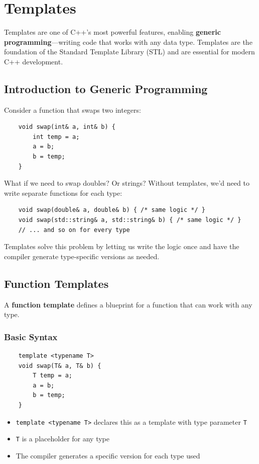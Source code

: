 \section{Templates}

Templates are one of C++'s most powerful features, enabling \textbf{generic programming}---writing code that works with any data type. Templates are the foundation of the Standard Template Library (STL) and are essential for modern C++ development.

\subsection{Introduction to Generic Programming}

Consider a function that swaps two integers:

\begin{lstlisting}
	void swap(int& a, int& b) {
		int temp = a;
		a = b;
		b = temp;
	}
\end{lstlisting}

What if we need to swap doubles? Or strings? Without templates, we'd need to write separate functions for each type:

\begin{lstlisting}
	void swap(double& a, double& b) { /* same logic */ }
	void swap(std::string& a, std::string& b) { /* same logic */ }
	// ... and so on for every type
\end{lstlisting}

Templates solve this problem by letting us write the logic once and have the compiler generate type-specific versions as needed.

\subsection{Function Templates}

A \textbf{function template} defines a blueprint for a function that can work with any type.

\subsubsection{Basic Syntax}

\begin{lstlisting}
	template <typename T>
	void swap(T& a, T& b) {
		T temp = a;
		a = b;
		b = temp;
	}
\end{lstlisting}

\begin{itemize}
	\item \texttt{template <typename T>} declares this as a template with type parameter \texttt{T}
	\item \texttt{T} is a placeholder for any type
	\item The compiler generates a specific version for each type used
\end{itemize}

